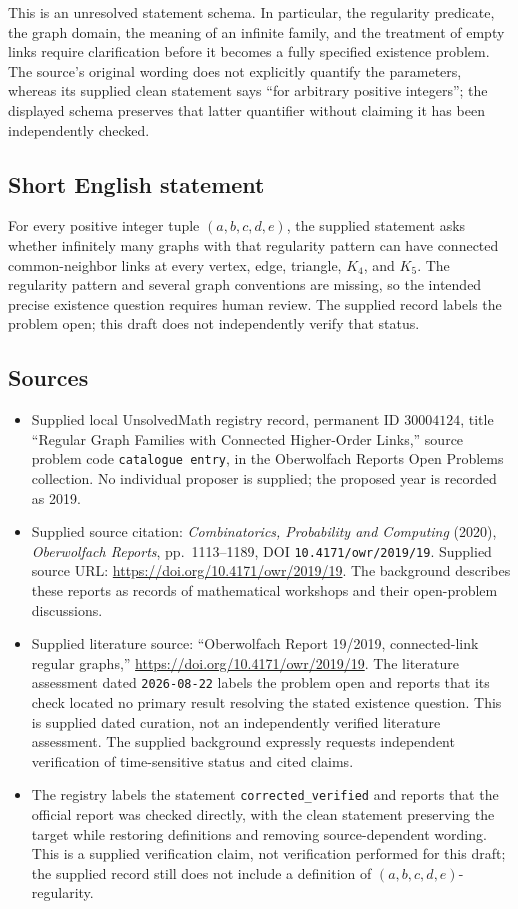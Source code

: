 \documentclass[11pt]{article}
\begin{document}
This is an unresolved statement schema. In particular, the regularity predicate, the graph domain, the meaning of an infinite family, and the treatment of empty links require clarification before it becomes a fully specified existence problem. The source's original wording does not explicitly quantify the parameters, whereas its supplied clean statement says ``for arbitrary positive integers''; the displayed schema preserves that latter quantifier without claiming it has been independently checked.
\subsection{Short English statement}
For every positive integer tuple $(a,b,c,d,e)$, the supplied statement asks whether infinitely many graphs with that regularity pattern can have connected common-neighbor links at every vertex, edge, triangle, $K_4$, and $K_5$. The regularity pattern and several graph conventions are missing, so the intended precise existence question requires human review. The supplied record labels the problem open; this draft does not independently verify that status.
\subsection{Sources}
\begin{itemize}
\item Supplied local UnsolvedMath registry record, permanent ID $30004124$, title ``Regular Graph Families with Connected Higher-Order Links,'' source problem code \texttt{catalogue entry}, in the Oberwolfach Reports Open Problems collection. No individual proposer is supplied; the proposed year is recorded as 2019.
\item Supplied source citation: \emph{Combinatorics, Probability and Computing} (2020), \emph{Oberwolfach Reports}, pp.\ 1113--1189, DOI \texttt{10.4171/owr/2019/19}. Supplied source URL: \url{https://doi.org/10.4171/owr/2019/19}. The background describes these reports as records of mathematical workshops and their open-problem discussions.
\item Supplied literature source: ``Oberwolfach Report 19/2019, connected-link regular graphs,'' \url{https://doi.org/10.4171/owr/2019/19}. The literature assessment dated \texttt{2026-08-22} labels the problem open and reports that its check located no primary result resolving the stated existence question. This is supplied dated curation, not an independently verified literature assessment. The supplied background expressly requests independent verification of time-sensitive status and cited claims.
\item The registry labels the statement \texttt{corrected\_verified} and reports that the official report was checked directly, with the clean statement preserving the target while restoring definitions and removing source-dependent wording. This is a supplied verification claim, not verification performed for this draft; the supplied record still does not include a definition of $(a,b,c,d,e)$-regularity.
\end{itemize}
\end{document}
